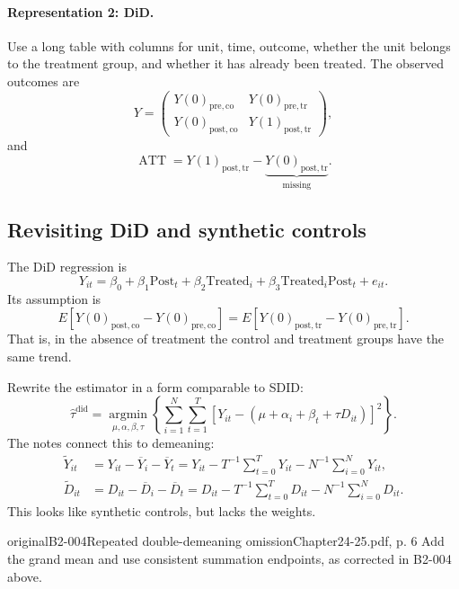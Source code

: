 \paragraph{Representation 2: DiD.}
Use a long table with columns for unit, time, outcome, whether the unit belongs to the treatment group, and whether it has already been treated.
The observed outcomes are
\[
Y=\begin{pmatrix}
Y(0)_{\mathrm{pre,co}}&Y(0)_{\mathrm{pre,tr}}\\
Y(0)_{\mathrm{post,co}}&Y(1)_{\mathrm{post,tr}}
\end{pmatrix},
\]
and
\[
\operatorname{ATT}=Y(1)_{\mathrm{post,tr}}
-\underbrace{Y(0)_{\mathrm{post,tr}}}_{\text{missing}}.
\]

\subsection{Revisiting DiD and synthetic controls}
The DiD regression is
\[
Y_{it}=\beta_0+\beta_1\mathrm{Post}_t+\beta_2\mathrm{Treated}_i
+\beta_3\mathrm{Treated}_i\mathrm{Post}_t+e_{it}.
\]
Its assumption is
\[
E[Y(0)_{\mathrm{post,co}}-Y(0)_{\mathrm{pre,co}}]
=E[Y(0)_{\mathrm{post,tr}}-Y(0)_{\mathrm{pre,tr}}].
\]
That is, in the absence of treatment the control and treatment groups have the same trend.

Rewrite the estimator in a form comparable to SDID:
\[
\widehat\tau^{\mathrm{did}}
=\operatorname*{argmin}_{\mu,\alpha,\beta,\tau}
\left\{\sum_{i=1}^{N}\sum_{t=1}^{T}
[Y_{it}-(\mu+\alpha_i+\beta_t+\tau D_{it})]^2\right\}.
\]
The notes connect this to demeaning:
\begin{align*}
\widetilde Y_{it}
&=Y_{it}-\overline Y_i-\overline Y_t
=Y_{it}-T^{-1}\sum_{t=0}^{T}Y_{it}-N^{-1}\sum_{i=0}^{N}Y_{it},\\
\widetilde D_{it}
&=D_{it}-\overline D_i-\overline D_t
=D_{it}-T^{-1}\sum_{t=0}^{T}D_{it}-N^{-1}\sum_{i=0}^{N}D_{it}.
\end{align*}
This looks like synthetic controls, but lacks the weights.
\begin{reviewnote}{original}{B2-004}{Repeated double-demeaning omission}{Chapter24-25.pdf, p. 6}
Add the grand mean and use consistent summation endpoints, as corrected in B2-004 above.
\par{}
\end{reviewnote}

